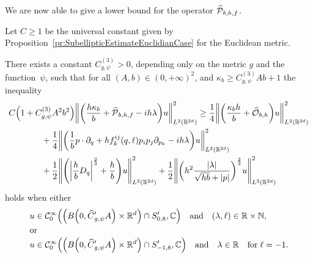\documentclass[10pt]{amsart}
\theoremstyle{definition}\newtheorem{defi}[theo]{Definition}\newtheorem{rema}[theo]{Remark}\newtheorem{exam}[theo]{Example}\newtheorem{exem}[theo]{Example}\newtheorem{nota}[theo]{Notation}
\newcommand{\C}{\mathbb{C}}
\newcommand{\R}{\mathbb{R}}
\newcommand{\N}{\mathbb{N}}
\newcommand{\clC}{\mathcal{C}}
\newcommand{\clO}{\mathcal{O}}
\newcommand{\clP}{\mathcal{P}}
\let\oldhat\hat
\renewcommand*{\hat}[1]{\mathchoice{\widehat{#1}}{\widehat{#1}}{\oldhat{#1}}{\oldhat{#1}}}
\let\originalleft\left
\let\originalright\right
\renewcommand{\left}{\mathopen{}\mathclose\bgroup\originalleft}
\renewcommand{\right}{\aftergroup\egroup\originalright}
\begin{document}
We are now able to give a lower bound for the operator $\hat{\clP}_{b,h,f}$.
\begin{prop}
Let $C\geq 1$ be the universal constant given by Proposition~\ref{pr:SubellipticEstimateEuclidianCase} for the Euclidean metric.

There exists a constant $C_{g,\psi}^{(3)}>0$, depending only on the metric $g$ and the function~$\psi$, such that for all $(A,b)\in (0,+\infty)^2$, and $\kappa_b \geq C_{g,\psi}^{(3)}Ab+1$ the inequality
\begin{multline}\label{eq:LowerBoundAfterChangeOfVariablesAndAfterGridPartition}
C\left(1 + C_{g,\psi}^{(3)}A^2b^2\right)\left\| \left(\frac{h\kappa_b}{b} + \hat{\clP}_{b,h,f} -i h\lambda \right) u \right\|_{L^2(\R^{2d})}^{2}
\geq \frac{1}{4} \left\|\left(\frac{\kappa_b h}{b}+\hat{\clO}_{b,h}\right) u\right\|_{L^2(\R^{2d})}^2
\\
\begin{aligned}
&+ \frac{1}{4}\left\| \left(\frac{1}{b} p\cdot\partial_q+hf^{ij}_{k}(q,\ell)p_ip_j\partial_{p_k}-i h \lambda \right)u \right\|_{L^2(\R^{2d})}^2
\\
&+\frac{1}{2} \left\| \left(\left|\frac{h}{b}D_{q} \right|^{\frac{2}{3}}+ \frac{h}{b}\right) u \right\|_{L^2(\R^{2d})}^{2} +
\frac{1}{2}\left\| \left(h^2 \frac{|\lambda|}{\sqrt{hb}+|p|} \right)^{\frac{2}{3}} u \right\|_{L^2(\R^{2d})}^{2}
\end{aligned}
\end{multline}
holds when either
\begin{align*}
u &\in \clC^\infty_0\left(\left(B\left(0,\hat{C}'_{g,\psi}A\right)\times \R^d\right)\cap S_{0,8}',\C\right)\quad\text{and}\quad (\lambda,\ell)\in \R\times \N,\\
\intertext{or}
u &\in \clC^\infty_0\left(\left(B\left(0,\hat{C}'_{g,\psi}A\right)\times \R^d\right)\cap S_{-1,8}',\C\right)\quad \text{and}\quad \lambda\in \R\quad\text{for}\; \ell=-1.
\end{align*}
\end{prop}
\end{document}
